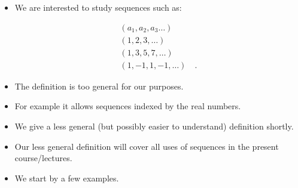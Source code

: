 \begin{frame}
\begin{itemize}
\item We are interested to study sequences such as:

\[
\begin{array}{l}
\left(a_1, a_2, a_3\dots\right)\\
\left(1,2,3,\dots\right) \\
\left(1,3,5,7, \dots\right)\\ 
\left(1, -1, 1, -1, \dots\right)\quad .
\end{array}
\]
\item<3-> The definition is too general for our purposes.
\item<4-> For example it allows sequences indexed by the real numbers.
\item<5-> We give a less general (but possibly easier to understand) definition shortly. 
\item<6-> Our less general definition will cover all uses of sequences in the present course/lectures.
\item<7-> We start by a few examples.
\end{itemize}
\end{frame}